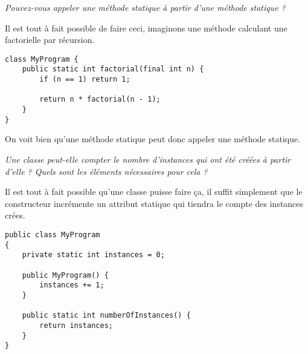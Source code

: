 \begin{exercise}[subtitle=test static]
\textit{Pouvez-vous appeler une méthode statique à partir d'une méthode statique ?}

Il est tout à fait possible de faire ceci, imaginons une méthode calculant une factorielle par récursion.

\begin{verbatim}
class MyProgram {
    public static int factorial(final int n) {
        if (n == 1) return 1;

        return n * factorial(n - 1);
    }
}
\end{verbatim}

On voit bien qu'une méthode statique peut donc appeler une méthode statique.

\end{exercise}

\begin{exercise}[subtitle=Nombre d'instances]

\textit{Une classe peut-elle compter le nombre d'instances qui ont été créées à partir d'elle ? Quels sont les éléments nécessaires pour cela ?}

Il est tout à fait possible qu'une classe puisse faire ça, il suffit simplement que le constructeur incrémente un attribut statique qui tiendra le compte des instances crées.

\begin{verbatim}
public class MyProgram
{
    private static int instances = 0;

    public MyProgram() {
        instances += 1;
    }

    public static int numberOfInstances() {
        return instances;
    }
}
\end{verbatim}

\end{exercise}
